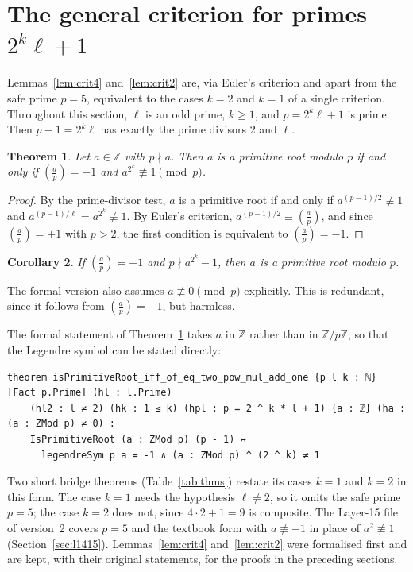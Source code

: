 \documentclass[11pt]{article}
\newtheorem{theorem}{Theorem}
\newtheorem{corollary}[theorem]{Corollary}
\theoremstyle{remark}
\newcommand{\leg}[2]{\left(\frac{#1}{#2}\right)}
\begin{document}
\section{\texorpdfstring{The general criterion for primes $2^k\ell+1$}{The general criterion}}\label{sec:general}

Lemmas~\ref{lem:crit4} and~\ref{lem:crit2} are, via Euler's criterion and apart from the safe prime
$p=5$, equivalent to the cases $k=2$ and $k=1$ of a single criterion.
Throughout this section, $\ell$ is an odd prime, $k\geq 1$, and $p=2^k\ell+1$ is prime. Then
$p-1=2^k\ell$ has exactly the prime divisors $2$ and $\ell$.

\begin{theorem}\label{thm:gen}
Let $a\in\mathbb{Z}$ with $p\nmid a$. Then $a$ is a primitive root modulo $p$ if and only if
$\leg{a}{p}=-1$ and $a^{2^k}\not\equiv 1\pmod p$.
\end{theorem}
\begin{proof}
By the prime-divisor test, $a$ is a primitive root if and only if $a^{(p-1)/2}\not\equiv 1$ and
$a^{(p-1)/\ell}=a^{2^k}\not\equiv 1$. By Euler's criterion, $a^{(p-1)/2}\equiv\leg{a}{p}$, and
since $\leg{a}{p}=\pm1$ with $p>2$, the first condition is equivalent to $\leg{a}{p}=-1$.
\end{proof}

\begin{corollary}\label{cor:gen-suff}
If $\leg{a}{p}=-1$ and $p\nmid a^{2^k}-1$, then $a$ is a primitive root modulo $p$.
\end{corollary}
The formal version also assumes $a\not\equiv 0\pmod p$ explicitly. This is redundant, since it
follows from $\leg{a}{p}=-1$, but harmless.


The formal statement of Theorem~\ref{thm:gen} takes $a$ in $\mathbb{Z}$ rather than in
$\mathbb{Z}/p\mathbb{Z}$, so that the Legendre symbol can be stated directly:
\begin{lstlisting}
theorem isPrimitiveRoot_iff_of_eq_two_pow_mul_add_one {p l k : ℕ} [Fact p.Prime] (hl : l.Prime)
    (hl2 : l ≠ 2) (hk : 1 ≤ k) (hpl : p = 2 ^ k * l + 1) {a : ℤ} (ha : (a : ZMod p) ≠ 0) :
    IsPrimitiveRoot (a : ZMod p) (p - 1) ↔
      legendreSym p a = -1 ∧ (a : ZMod p) ^ (2 ^ k) ≠ 1
\end{lstlisting}
Two short bridge theorems (Table~\ref{tab:thms}) restate its cases $k=1$ and $k=2$ in this form.
The case $k=1$ needs the hypothesis $\ell\neq 2$, so it omits the safe prime $p=5$; the case
$k=2$ does not, since $4\cdot2+1=9$ is composite. The Layer-15 file of version~2 covers $p=5$ and the
textbook form with $a\not\equiv-1$ in place of $a^2\not\equiv1$ (Section~\ref{sec:l1415}). Lemmas~\ref{lem:crit4} and~\ref{lem:crit2}
were formalised first and are kept, with their original statements, for the proofs in the
preceding sections.
\end{document}

